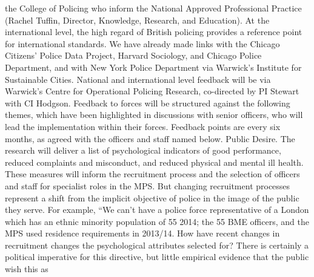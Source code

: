 \documentclass[11pt, a4paper]{article}
\begin{document}
the College of Policing who inform the National Approved Professional Practice (Rachel
Tuffin, Director, Knowledge, Research, and Education). At the international level, the high
regard of British policing provides a reference point for international standards. We have
already made links with the Chicago Citizens’ Police Data Project, Harvard Sociology, and
Chicago Police Department, and with New York Police Department via Warwick’s Institute for
Sustainable Cities. National and international level feedback will be via Warwick’s Centre for
Operational Policing Research, co-directed by PI Stewart with CI Hodgson.
Feedback to forces will be structured against the following themes, which have been
highlighted in discussions with senior officers, who will lead the implementation within their
forces. Feedback points are every six months, as agreed with the officers and staff named
below.
Public Desire. The research will deliver a list of psychological indicators of good
performance, reduced complaints and misconduct, and reduced physical and mental ill
health. These measures will inform the recruitment process and the selection of officers and
staff for specialist roles in the MPS. But changing recruitment processes represent a shift
from the implicit objective of police in the image of the public they serve. For example, “We
can’t have a police force representative of a London which has an ethnic minority population
of 55%
2014; the 55%
BME officers, and the MPS used residence requirements in 2013/14. How have recent
changes in recruitment changes the psychological attributes selected for? There is certainly
a political imperative for this directive, but little empirical evidence that the public wish this as
\end{document}
